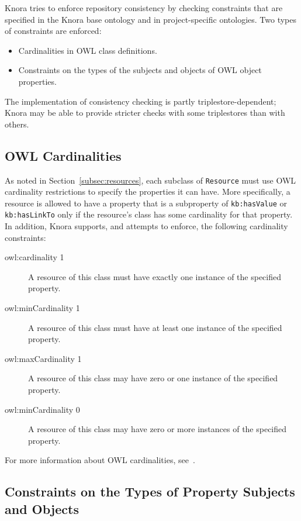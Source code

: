 \documentclass[12pt, a4paper]{article}
\begin{document}
Knora tries to enforce repository consistency by checking constraints that are specified in the Knora base ontology and in project-specific ontologies. Two types of constraints are enforced:

\begin{itemize}
	\item Cardinalities in OWL class definitions.
	\item Constraints on the types of the subjects and objects of OWL object properties.
\end{itemize}

The implementation of consistency checking is partly triplestore-dependent; Knora may be able to provide stricter checks with some triplestores than with others.

\subsection{OWL Cardinalities}

\label{subsec:cardinalities}

As noted in Section~\ref{subsec:resources}, each subclass of \texttt{Resource} must use OWL cardinality restrictions to specify the properties it can have. More specifically, a resource is allowed to have a property that is a subproperty of \texttt{kb:hasValue} or \texttt{kb:hasLinkTo} only if the resource's class has some cardinality for that property. In addition, Knora supports, and attempts to enforce, the following cardinality constraints:
 
\begin{description}
	\item[owl:cardinality 1] A resource of this class must have exactly one instance of the specified property.
	\item[owl:minCardinality 1] A resource of this class must have at least one instance of the specified property.
	\item[owl:maxCardinality 1] A resource of this class may have zero or one instance of the specified property.
	\item[owl:minCardinality 0] A resource of this class may have zero or more instances of the specified property.
\end{description}

For more information about OWL cardinalities, see~\cite[§2.1, Object Property Restrictions]{OWL_2_Quick_Reference_Guide}.

\subsection{Constraints on the Types of Property Subjects and Objects}
\end{document}
